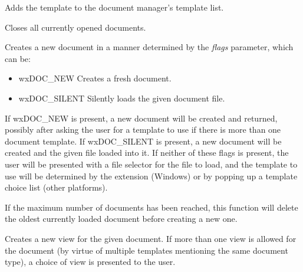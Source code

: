 

Adds the template to the document manager's template list.



Closes all currently opened documents.



Creates a new document in a manner determined by the {\it flags} parameter, which can be:

\begin{itemize}\itemsep=0pt
\item wxDOC\_NEW Creates a fresh document.
\item wxDOC\_SILENT Silently loads the given document file.
\end{itemize}

If wxDOC\_NEW is present, a new document will be created and returned, possibly after
asking the user for a template to use if there is more than one document template.
If wxDOC\_SILENT is present, a new document will be created and the given file loaded
into it. If neither of these flags is present, the user will be presented with
a file selector for the file to load, and the template to use will be determined by the
extension (Windows) or by popping up a template choice list (other platforms).

If the maximum number of documents has been reached, this function
will delete the oldest currently loaded document before creating a new one.



Creates a new view for the given document. If more than one view is allowed for the
document (by virtue of multiple templates mentioning the same document type), a choice
of view is presented to the user.



